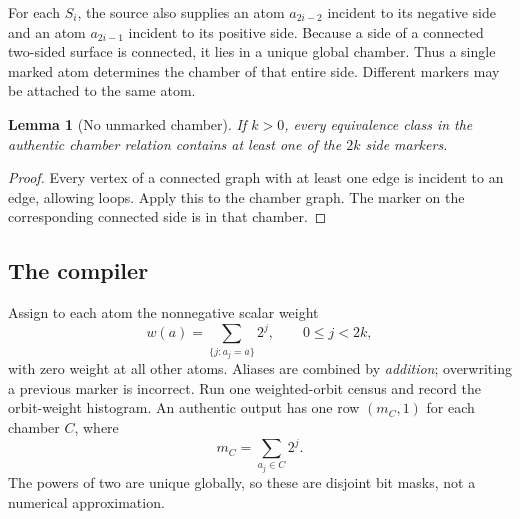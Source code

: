 \documentclass[11pt]{article}
\newtheorem{lemma}[theorem]{Lemma}
\theoremstyle{definition}
\begin{document}
For each $S_i$, the source also supplies an atom $a_{2i-2}$ incident to its negative side and an atom $a_{2i-1}$ incident to its positive side. Because a side of a connected two-sided surface is connected, it lies in a unique global chamber. Thus a single marked atom determines the chamber of that entire side. Different markers may be attached to the same atom.

\begin{lemma}[No unmarked chamber]\label{lem:marked}
If $k>0$, every equivalence class in the authentic chamber relation contains at least one of the $2k$ side markers.
\end{lemma}
\begin{proof}
Every vertex of a connected graph with at least one edge is incident to an edge, allowing loops. Apply this to the chamber graph. The marker on the corresponding connected side is in that chamber.
\end{proof}

\subsection{The compiler}
Assign to each atom the nonnegative scalar weight
\begin{equation}\label{eq:marker-weight}
 w(a)=\sum_{\{j:a_j=a\}}2^j,\qquad 0\leq j<2k,
\end{equation}
with zero weight at all other atoms. Aliases are combined by \emph{addition}; overwriting a previous marker is incorrect. Run one weighted-orbit census and record the orbit-weight histogram. An authentic output has one row $(m_C,1)$ for each chamber $C$, where
\[
 m_C=\sum_{a_j\in C}2^j.
\]
The powers of two are unique globally, so these are disjoint bit masks, not a numerical approximation.
\end{document}
